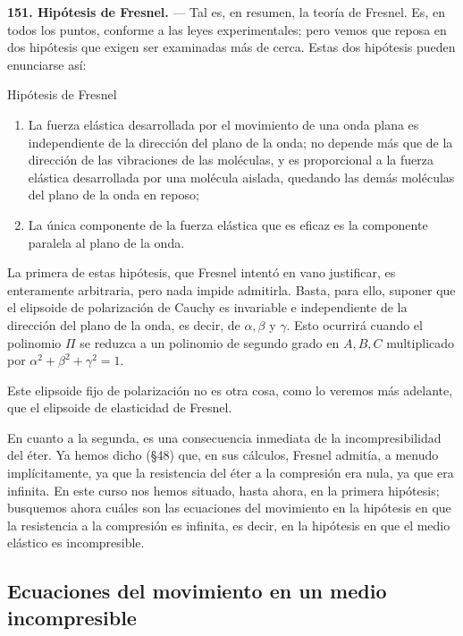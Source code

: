 \noindent\textbf{151. Hipótesis de Fresnel.} — Tal es, en resumen, la
teoría de Fresnel. Es, en todos los puntos, conforme a las leyes
experimentales; pero vemos que reposa en dos hipótesis que exigen ser
examinadas más de cerca. Estas dos hipótesis pueden enunciarse así:

\begin{enunciado}{Hipótesis de Fresnel}
\begin{enumerate}
\item[1.\textsuperscript{o}] La fuerza elástica desarrollada por el movimiento de una
onda plana es independiente de la dirección del plano de la onda; no
depende más que de la dirección de las vibraciones de las moléculas, y es
proporcional a la fuerza elástica desarrollada por una molécula aislada,
quedando las demás moléculas del plano de la onda en reposo;
\item[2.\textsuperscript{o}] La única componente de la fuerza elástica que es eficaz
es la componente paralela al plano de la onda.
\end{enumerate}
\end{enunciado}

La primera de estas hipótesis, que Fresnel intentó en vano justificar, es
enteramente arbitraria, pero nada impide admitirla. Basta, para ello,
suponer que el elipsoide de polarización de Cauchy es invariable e
independiente de la dirección del plano de la onda, es decir, de
$\alpha,\beta$ y $\gamma$. Esto ocurrirá cuando el polinomio $\Pi$ se
reduzca a un polinomio de segundo grado en $A,B,C$ multiplicado por
$\alpha^2+\beta^2+\gamma^2=1$.

Este elipsoide fijo de polarización no es otra cosa, como lo veremos más
adelante, que el elipsoide de elasticidad de Fresnel.

En cuanto a la segunda, es una consecuencia inmediata de la
incompresibilidad del éter. Ya hemos dicho (§48) que, en sus cálculos,
Fresnel admitía, a menudo implícitamente, ya que la resistencia del éter a
la compresión era nula, ya que era infinita. En este curso nos hemos
situado, hasta ahora, en la primera hipótesis; busquemos ahora cuáles son
las ecuaciones del movimiento en la hipótesis en que la resistencia a la
compresión es infinita, es decir, en la hipótesis en que el medio elástico
es incompresible.

\subsection{Ecuaciones del movimiento en un medio incompresible}


